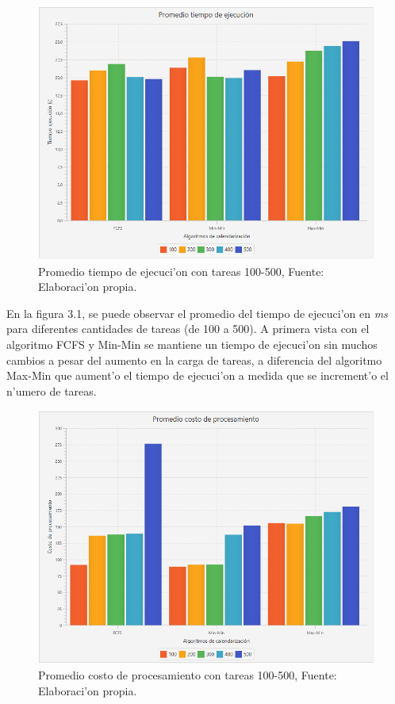 \begin{figure}[H] 
	\caption{Promedio tiempo de ejecuci'on con tareas 100-500, Fuente: Elaboraci'on propia.}
	\centering
	\includegraphics[scale=0.5]{media/tiempoejecucion}
\end{figure}

En la figura 3.1, se puede observar el promedio del tiempo de ejecuci'on en \emph{ms} para diferentes cantidades de tareas (de 100 a 500). A primera vista con el algoritmo FCFS y Min-Min se mantiene un tiempo de ejecuci'on sin muchos cambios a pesar del aumento en la carga de tareas, a diferencia del algoritmo Max-Min que aument'o el tiempo de ejecuci'on a medida que se increment'o el n'umero de tareas.

\begin{figure}[H] 
	\caption{Promedio costo de procesamiento con tareas 100-500, Fuente: Elaboraci'on propia.}
	\centering
	\includegraphics[scale=0.5]{media/costoproce}
\end{figure}



